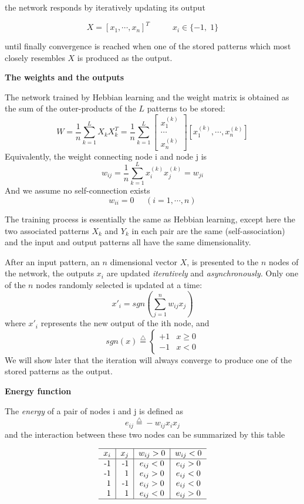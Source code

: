 the network responds by iteratively updating its output 

\[ X=[x_1,\cdots, x_n]^T\;\;\;\;\;\;\;\;\;\;x_i \in\{-1,\;1\} \]

until finally convergence is reached when one of the stored patterns which
most closely resembles $X$ is produced as the output.


{\bf The weights and the outputs}

The network trained by Hebbian learning and the weight matrix is obtained as
the sum of the outer-products of the $L$ patterns to be stored:
\[	W=\frac{1}{n}\sum_{k=1}^L X_k X_k^T= \frac{1}{n}\sum_{k=1}^L 
   \left[ \begin{array}{c} x_1^{(k)} \\ \cdots \\ x_n^{(k)} \end{array} \right]
   [ x_1^{(k)}, \cdots, x_n^{(k)} ]	\]
Equivalently, the weight connecting node i and node j is
\[	w_{ij}=\frac{1}{n}\sum_{k=1}^L x_i^{(k)} x_j^{(k)}=w_{ji}	\]
And we assume no self-connection exists
\[	w_{ii}=0 \;\;\;\;\;(i=1,\cdots,n)	\]

The training process is essentially the same as Hebbian learning, except here
the two associated patterns $X_k$ and $Y_k$ in each pair are the same 
(self-association) and the input and output patterns all have the same
dimensionality.

After an input pattern, an $n$ dimensional vector $X$, is presented to the 
$n$ nodes of the network, the outputs $x_i$ are updated {\em iteratively} and 
{\em asynchronously}. Only one of the $n$ nodes randomly selected is updated 
at a time:
\[	x'_i=sgn(\sum_{j=1}^n w_{ij}x_j)	\]
where $x'_i$ represents the new output of the ith node, and
\[	sgn(x)\stackrel{\triangle}{=}\left\{ \begin{array}{ll} 
		+1 & x \geq 0 \\ -1 & x < 0 \end{array} \right.
\]
We will show later that the iteration will always converge to produce one of 
the stored patterns as the output.

{\bf Energy function}

The {\em energy} of a pair of nodes i and j is defined as
\[	e_{ij}\stackrel{\triangle}{=}-w_{ij}x_ix_j	\]
and the interaction between these two nodes can be summarized by this table

\[
\begin{tabular}{ r | r | c | c} \hline
	$x_i$	& $x_j$	& $w_{ij}>0$ 	& $w_{ij}<0$	\\  \hline
	-1	& -1	& $e_{ij}<0$	& $e_{ij}>0$	\\
	-1	&  1	& $e_{ij}>0$	& $e_{ij}<0$	\\
	 1	& -1	& $e_{ij}>0$	& $e_{ij}<0$	\\
	 1	&  1	& $e_{ij}<0$	& $e_{ij}>0$	\\  \hline
\end{tabular}
\]

